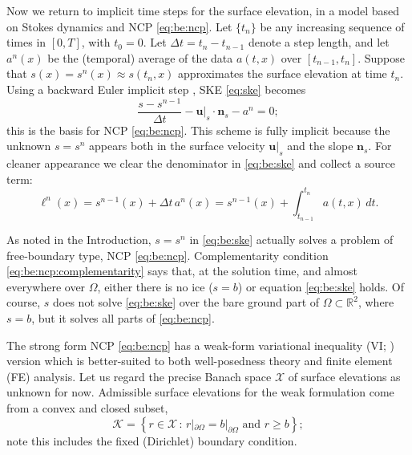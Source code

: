 \documentclass[hidelinks,onefignum,onetabnum,final]{siamart220329}  %
\newcommand{\RR}{\mathbb{R}}
\newcommand{\bn}{\mathbf{n}}
\newcommand{\bu}{\mathbf{u}}
\newcommand{\cK}{\mathcal{K}}
\newcommand{\cX}{\mathcal{X}}
\begin{document}
Now we return to implicit time steps for the surface elevation, in a model based on Stokes dynamics and NCP \eqref{eq:be:ncp}.  Let $\{t_n\}$ be any increasing sequence of times in $[0,T]$, with $t_0=0$.  Let $\Delta t = t_n-t_{n-1}$ denote a step length, and let $a^n(x)$ be the (temporal) average of the data $a(t,x)$ over $[t_{n-1},t_n]$.  Suppose that $s(x)=s^n(x)\approx s(t_n,x)$ approximates the surface elevation at time $t_n$.  Using a backward Euler implicit step \cite{AscherPetzold1998}, SKE \eqref{eq:ske} becomes
\begin{equation}
\frac{s - s^{n-1}}{\Delta t} - \bu|_{s} \cdot \bn_{s} - a^n = 0; \label{eq:be:ske}
\end{equation}
this is the basis for NCP \eqref{eq:be:ncp}.  This scheme is fully implicit because the unknown $s=s^n$ appears both in the surface velocity $\bu|_s$ and the slope $\bn_s$.  For cleaner appearance we clear the denominator in \eqref{eq:be:ske} and collect a source term:
\begin{equation}
\ell^n(x) = s^{n-1}(x)+\Delta t\,a^n(x) = s^{n-1}(x) + \int_{t_{n-1}}^{t_n} a(t,x)\,dt. \label{eq:be:source}
\end{equation}

As noted in the Introduction, $s=s^n$ in \eqref{eq:be:ske} actually solves a problem of free-boundary type, NCP \eqref{eq:be:ncp}.  Complementarity condition \eqref{eq:be:ncp:complementarity} says that, at the solution time, and almost everywhere over $\Omega$, either there is no ice ($s=b$) or equation \eqref{eq:be:ske} holds.  Of course, $s$ does not solve \eqref{eq:be:ske} over the bare ground part of $\Omega \subset \RR^2$, where $s=b$, but it solves all parts of \eqref{eq:be:ncp}.

The strong form NCP \eqref{eq:be:ncp} has a weak-form variational inequality (VI; \cite{Evans2010,KinderlehrerStampacchia1980}) version which is better-suited to both well-posedness theory and finite element (FE) analysis.  Let us regard the precise Banach space $\cX$ of surface elevations as unknown for now.  Admissible surface elevations for the weak formulation come from a convex and closed subset,
\begin{equation}
\cK = \left\{r \in\cX\,:\,r|_{\partial\Omega}=b|_{\partial\Omega} \text{ and } r \ge b\right\};  \label{eq:be:admissible}
\end{equation}
note this includes the fixed (Dirichlet) boundary condition.
\end{document}
